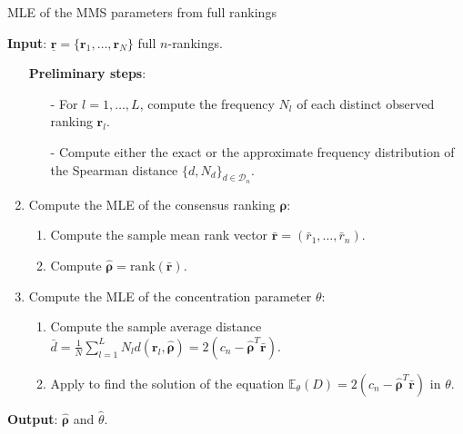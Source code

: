 \begin{algorithm}[h]\small
\caption{MLE of the MMS parameters from full rankings}
\label{alg:full}
\hspace*{\algorithmicindent} \textbf{Input}: $\underline{\bm{r}}=\{\bm{r}_1,\dots,\bm{r}_N\}$ full $n$-rankings.
\begin{enumerate}
    \item[] \textbf{Preliminary steps}:
\begin{itemize}
    \item[-] For $l=1,\dots,L$, compute the frequency $N_l$ of each distinct observed ranking $\bm{r}_l$.
    \item[-] Compute either the exact or the
approximate frequency distribution of the Spearman distance $\{d,N_d\}_{d\in\mathcal{D}_n}$.
    \end{itemize}
    \item Compute the MLE of the consensus ranking $\bm\rho$:
    \begin{enumerate}
        \item Compute the sample mean rank vector ${\bm{\bar r}}=(\bar{r}_1,\ldots,\bar{r}_n)$.
        \item Compute $\hat{\bm{\rho}}=\text{rank}({\bm{\bar r}})$.
    \end{enumerate}
    \item Compute the MLE of the concentration parameter $\theta$:
    \begin{enumerate}
        \item  Compute the sample average distance $\bar d=\frac{1}{N}\sum_{l=1}^LN_ld(\bm{r}_l,\hat{\bm{\rho}})=2(c_n-\hat{\bm{\rho}}^T{\bm{\bar r}})$.
        \item  Apply  to find the solution of the equation $\mathbb{E}_{\theta}(D) = 2(c_n-\hat{\bm{\rho}}^T{\bm{\bar r}})$ in $\theta$.
    \end{enumerate}
\end{enumerate}
    \hspace*{\algorithmicindent} \textbf{Output}: $\hat{\bm{\rho}}$ and $\hat{\theta}$.
\end{algorithm}


